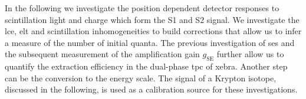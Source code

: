 In the following we investigate the position dependent detector responses to scintillation light and charge which form the S1 and S2 signal.
We investigate the \gls{lce}, \gls{elt} and scintillation inhomogeneities to build corrections that allow us to infer a measure of the number of initial quanta.
The previous investigation of \glspl{se} and the subsequent measurement of the amplification gain $ g_\mathrm{SE} $ further allow us to quantify the extraction efficiency in the dual-phase \gls{tpc} of \gls{xebra}.
Another step can be the conversion to the energy scale.
The signal of a Krypton isotope, discussed in the following, is used as a calibration source for these investigations.



\newpage

\newpage

\newpage

\newpage

\newpage

\newpage

\newpage

\newpage
\FloatBarrier
